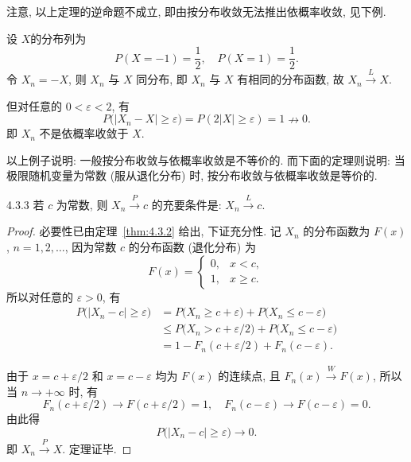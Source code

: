 注意, 以上定理的逆命题不成立, 即由按分布收敛无法推出依概率收敛, 见下例.

\begin{example}\label{exam:4.3.2}
    设 $ X $的分布列为
    \begin{equation*}
        P ( X = -1 ) = \frac{1}{2}, \quad P ( X = 1) = \frac{1}{2}.
    \end{equation*}
    令 $ X_n = -X $, 则 $ X_n $ 与 $ X $ 同分布, 即 $ X_n $ 与 $ X $ 有相同的分布函数, 故 $ X_n \stackrel{L}{\to} X $.

    但对任意的 $ 0 < \varepsilon < 2 $, 有
    \begin{equation*}
        P \bigl( \bigl\lvert X_n - X \bigr\rvert \geq \varepsilon \bigr) = P ( 2 \lvert X \rvert \geq \varepsilon ) = 1 \nrightarrow 0.
    \end{equation*}
    即 $ X_n $ 不是依概率收敛于 $ X $.
\end{example}

以上例子说明: 一般按分布收敛与依概率收敛是不等价的.
而下面的定理则说明: 当极限随机变量为常数 (服从退化分布) 时, 按分布收敛与依概率收敛是等价的.

\begin{theorem}{}{4.3.3}
    若 $ c $ 为常数, 则 $ X_n \stackrel{P}{\to} c $ 的充要条件是: $ X_n \stackrel{L}{\to} c $.
\end{theorem}

\begin{proof}
    必要性已由定理~\ref{thm:4.3.2} 给出, 下证充分性.
    记 $ X_n $ 的分布函数为 $ F (x) $, $ n = 1, 2, \dotsc $, 因为常数 $ c $ 的分布函数 (退化分布) 为
    \begin{equation*}
        F (x) =
        \begin{cases}
            0, & x < c,\\
            1, & x \geq c.
        \end{cases}
    \end{equation*}
    所以对任意的 $ \varepsilon > 0 $, 有
    \begin{align*}
        P \big( \big\lvert X_n - c \bigr\rvert \geq \varepsilon \bigr)
        & = P \bigl( X_n \geq c + \varepsilon \bigr) + P \bigl( X_n \leq c - \varepsilon \bigr)\\
        & \leq P \bigl( X_n > c + \varepsilon / 2 \bigr) + P \bigl( X_n \leq c - \varepsilon \bigr)\\
        & = 1 - F_n ( c + \varepsilon / 2 ) + F_n ( c - \varepsilon ).
    \end{align*}

    由于 $ x = c + \varepsilon / 2 $ 和 $ x = c - \varepsilon $ 均为 $ F (x) $ 的连续点, 且 $ F_n (x) \stackrel{W}{\to} F (x) $, 所以当 $ n \to +\infty $ 时, 有
    \begin{equation*}
        F_n ( c + \varepsilon / 2 ) \to F ( c + \varepsilon / 2 ) = 1, \quad F_n ( c - \varepsilon) \to F ( c - \varepsilon ) = 0.
    \end{equation*}
    由此得
    \begin{equation*}
        P \bigl( \bigl\lvert X_n - c \bigr\rvert \geq \varepsilon \bigr) \to 0.
    \end{equation*}
    即 $ X_n \stackrel{P}{\to} X $.
    定理证毕.
\end{proof}

